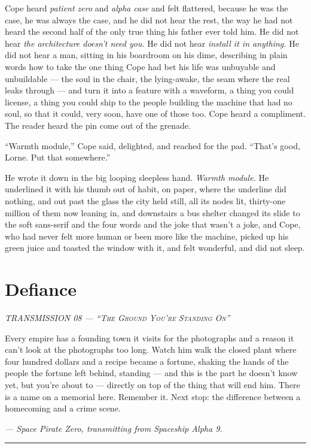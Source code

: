 \documentclass[11pt,openany]{book}
\newcommand{\transheader}{\normalfont\footnotesize\scshape\letterspace}
\newcommand{\letterspace}{}
\newenvironment{transmission}{%
  \par\vspace{0.3\baselineskip}\begin{center}\begin{minipage}{0.88\textwidth}%
  \itshape\small\setlength{\parindent}{0pt}\setstretch{1.06}}%
  {\end{minipage}\end{center}\vspace{0.4\baselineskip}%
  \noindent\hfil\rule{0.35\textwidth}{0.3pt}\hfil\par\vspace{1.0\baselineskip}}
\begin{document}
Cope heard \textit{patient zero} and \textit{alpha case} and felt flattered, because he was the case, he was always the case, and he did not hear the rest, the way he had not heard the second half of the only true thing his father ever told him. He did not hear \textit{the architecture doesn't need you.} He did not hear \textit{install it in anything.} He did not hear a man, sitting in his boardroom on his dime, describing in plain words how to take the one thing Cope had bet his life was unbuyable and unbuildable --- the soul in the chair, the lying-awake, the seam where the real leaks through --- and turn it into a feature with a waveform, a thing you could license, a thing you could ship to the people building the machine that had no soul, so that it could, very soon, have one of those too. Cope heard a compliment. The reader heard the pin come out of the grenade.

``Warmth module,'' Cope said, delighted, and reached for the pad. ``That's good, Lorne. Put that somewhere.''

He wrote it down in the big looping sleepless hand. \textit{Warmth module.} He underlined it with his thumb out of habit, on paper, where the underline did nothing, and out past the glass the city held still, all its nodes lit, thirty-one million of them now leaning in, and downstairs a bus shelter changed its slide to the soft sans-serif and the four words and the joke that wasn't a joke, and Cope, who had never felt more human or been more like the machine, picked up his green juice and toasted the window with it, and felt wonderful, and did not sleep.

\clearpage
\chapter{Defiance}

\begin{transmission}
{\transheader TRANSMISSION 08 --- ``The Ground You're Standing On''}\par\vspace{0.5em}
Every empire has a founding town it visits for the photographs and a reason it can't look at the photographs too long. Watch him walk the closed plant where four hundred dollars and a recipe became a fortune, shaking the hands of the people the fortune left behind, standing --- and this is the part he doesn't know yet, but you're about to --- directly on top of the thing that will end him. There is a name on a memorial here. Remember it. Next stop: the difference between a homecoming and a crime scene.\par
\vspace{0.5em}\hfill\textit{--- Space Pirate Zero, transmitting from Spaceship Alpha 9.}\par
\end{transmission}
\end{document}
